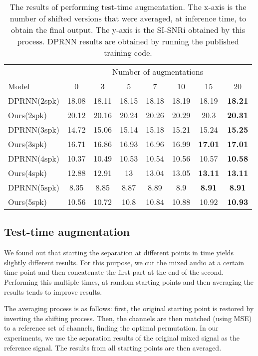 \documentclass{article}
\begin{document}
\begin{table}[t]
    \centering
    \caption{The results of performing test-time augmentation. The x-axis is the number of shifted versions that were averaged, at inference time, to obtain the final output. The y-axis is the SI-SNRi obtained by this process. DPRNN results are obtained by running the published training code.}
    \label{tab:ttaug}
    \renewcommand{\arraystretch}{1.2}
    \begin{tabular}{@{}l@{~~}c@{~}c@{~}c@{~}c@{~}c@{~}c@{~}c@{}}
    \toprule
    	& \multicolumn{7}{c}{Number of augmentations}\\
	\cmidrule{2-8}
Model	& 0  & 3 & 5 & 7 & 10 & 15 & 20 \\
\midrule
DPRNN(2spk)	& 18.08& 18.11& 18.15& 18.18& 18.19& 18.19& \bf 18.21 \\
Ours(2spk)	& 20.12  & 20.16 & 20.24 & 20.26 & 20.29 & 20.3 & \bf 20.31 \\
\midrule
DPRNN(3spk)	& 14.72  & 15.06 & 15.14 & 15.18 & 15.21 & 15.24 & \bf 15.25 \\
Ours(3spk)	& 16.71  & 16.86 & 16.93 & 16.96 & 16.99 & \bf 17.01 & \bf 17.01 \\
\midrule
DPRNN(4spk)	& 10.37  & 10.49 & 10.53 & 10.54 & 10.56 & 10.57 & \bf 10.58 \\
Ours(4spk)	& 12.88  & 12.91 & 13 & 13.04 & 13.05 & \bf 13.11 & \bf 13.11 \\
\midrule
DPRNN(5spk)	& 8.35  & 8.85 & 8.87 & 8.89 & 8.9 & \bf 8.91 & \bf 8.91 \\
Ours(5spk)	& 10.56  & 10.72 & 10.8 & 10.84 & 10.88 & 10.92 & \bf 10.93 \\
\bottomrule
\end{tabular}
\end{table}


\subsection{Test-time augmentation}
We found out that starting the separation at different points in time yields slightly different results. For this purpose, we cut the mixed audio at a certain time point and then concatenate the first part at the end of the second. Performing this multiple times, at random starting points and then averaging the results tends to improve results.

The averaging process is as follows: first, the original starting point is restored by inverting the shifting process. Then, the channels are then matched (using MSE) to a reference set of channels, finding the optimal permutation. In our experiments, we use the separation results of the original mixed signal as the reference signal. The results from all starting points are then averaged.
\end{document}
